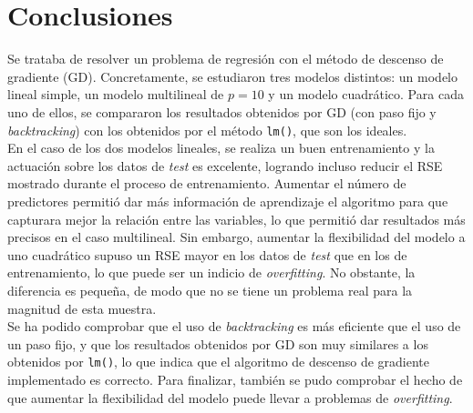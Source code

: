\documentclass[11pt]{opticajnl}
\begin{document}
\section{Conclusiones}

Se trataba de resolver un problema de regresión con el método de descenso de gradiente (GD). Concretamente, se estudiaron tres modelos distintos: un modelo lineal simple, un modelo multilineal de $p = 10$ y un modelo cuadrático. Para cada uno de ellos, se compararon los resultados obtenidos por GD (con paso fijo y \textit{backtracking}) con los obtenidos por el método \texttt{lm()}, que son los ideales. \\

En el caso de los dos modelos lineales, se realiza un buen entrenamiento y la actuación sobre los datos de \textit{test} es excelente, logrando incluso reducir el RSE mostrado durante el proceso de entrenamiento. Aumentar el número de predictores permitió dar más información de aprendizaje el algoritmo para que capturara mejor la relación entre las variables, lo que permitió dar resultados más precisos en el caso multilineal. Sin embargo, aumentar la flexibilidad del modelo a uno cuadrático supuso un RSE mayor en los datos de \textit{test} que en los de entrenamiento, lo que puede ser un indicio de \textit{overfitting}. No obstante, la diferencia es pequeña, de modo que no se tiene un problema real para la magnitud de esta muestra. \\

Se ha podido comprobar que el uso de \textit{backtracking} es más eficiente que el uso de un paso fijo, y que los resultados obtenidos por GD son muy similares a los obtenidos por \texttt{lm()}, lo que indica que el algoritmo de descenso de gradiente implementado es correcto. Para finalizar, también se pudo comprobar el hecho de que aumentar la flexibilidad del modelo puede llevar a problemas de \textit{overfitting}.
\end{document}
